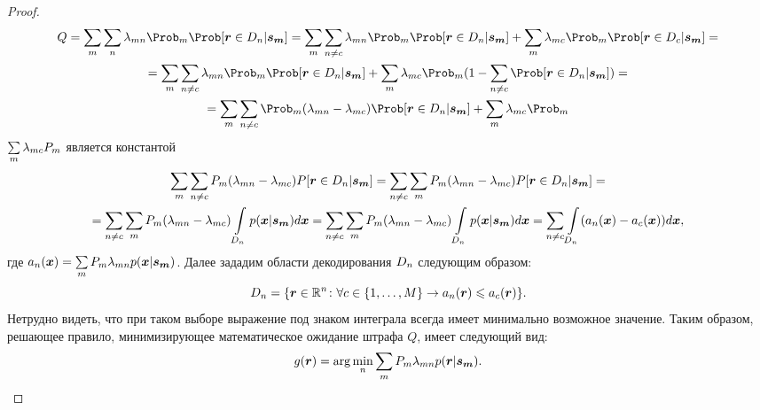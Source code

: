 \documentclass{book}
\numberwithin{theorem}{chapter}
\numberwithin{statement}{chapter}
\numberwithin{lemma}{chapter}
\theoremstyle{definition}
\numberwithin{task}{chapter}
\theoremstyle{remark}
\numberwithin{example}{chapter}
\theoremstyle{definition}
\numberwithin{definition}{chapter}
\theoremstyle{remark}
\theoremstyle{remark}
\numberwithin{lyrics}{section}
\begin{document}
\begin{proof}
	\begin{gather*}
	Q = \Sum_{m} \Sum_{n} \lambda_{mn} \Prob_m \Prob[\vec{r} \in D_n|\vec{s_m}] = 
	\Sum_{m} \Sum_{n \neq c} \lambda_{mn} \Prob_m \Prob[\vec{r} \in D_n|\vec{s_m}] + \Sum_{m} \lambda_{mc} \Prob_m \Prob[\vec{r} \in D_c|\vec{s_m}] = \\
	= \Sum_{m} \Sum_{n \neq c} \lambda_{mn} \Prob_m \Prob[\vec{r} \in D_n|\vec{s_m}] + \Sum_{m} \lambda_{mc} \Prob_m (1 - \Sum_{n\neq c} \Prob[\vec{r} \in D_n|\vec{s_m}]) = \\
	= \Sum_{m} \Sum_{n \neq c} \Prob_m  (\lambda_{mn} - \lambda_{mc}) \Prob[\vec{r} \in D_n|\vec{s_m}] + \Sum_{m} \lambda_{mc} \Prob_m
	\end{gather*}
	$\sum\limits_{m} \lambda_{mc} P_m$ является константой
	\begin{gather*}
	\sum\limits_{m} \sum\limits_{n \neq c} P_m (\lambda_{mn} - \lambda_{mc}) P[\bm{r} \in D_n|\bm{s_m}] = 
	\sum\limits_{n \neq c} \sum\limits_{m} P_m (\lambda_{mn} - \lambda_{mc}) P[\bm{r} \in D_n|\bm{s_m}] = \\ 
	= \sum\limits_{n \neq c} \sum\limits_{m} P_m (\lambda_{mn} - \lambda_{mc}) \int\limits_{D_n} p(\bm{x}|\bm{s_m}) d\bm{x} =
	\sum\limits_{n \neq c} \sum\limits_{m} P_m (\lambda_{mn} - \lambda_{mc}) \int\limits_{D_n} p(\bm{x}|\bm{s_m}) d\bm{x} = 
	\sum\limits_{n \neq c} \int\limits_{D_n} (a_n(\bm{x}) - a_c(\bm{x})) d\bm{x},
	\end{gather*}
	где $a_n(\bm{x}) = \sum\limits_{m} P_m \lambda_{mn} p(\bm{x}|\bm{s_m})$. Далее зададим области декодирования $D_n$ следующим образом:
	\begin{equation}
	D_n = \{\bm{r} \in \mathbb{R}^{n} \colon \forall c \in \{1, \dots, M\} \rightarrow a_n(\bm{r}) \leqslant a_c(\bm{r})\}.
	\end{equation}
	Нетрудно видеть, что при таком выборе выражение под знаком интеграла всегда имеет минимально возможное значение. Таким образом, решающее правило, минимизирующее математическое ожидание штрафа $Q$, имеет следующий вид:
	\begin{equation}
	g(\bm{r}) = \arg \min_{n} \sum\limits_m P_m \lambda_{mn} p(\bm{r}|\bm{s_{m}}).
	\end{equation}
\end{proof}
\end{document}
